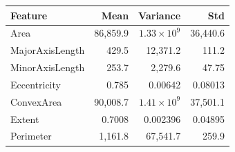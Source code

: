 \begin{tabular}{lrrr}
\toprule
Feature & Mean & Variance & Std \\
\midrule
Area & 86,859.9 & $1.33\times10^{9}$ & 36,440.6 \\
MajorAxisLength & 429.5 & 12,371.2 & 111.2 \\
MinorAxisLength & 253.7 & 2,279.6 & 47.75 \\
Eccentricity & 0.785 & 0.00642 & 0.08013 \\
ConvexArea & 90,008.7 & $1.41\times10^{9}$ & 37,501.1 \\
Extent & 0.7008 & 0.002396 & 0.04895 \\
Perimeter & 1,161.8 & 67,541.7 & 259.9 \\
\bottomrule
\end{tabular}

